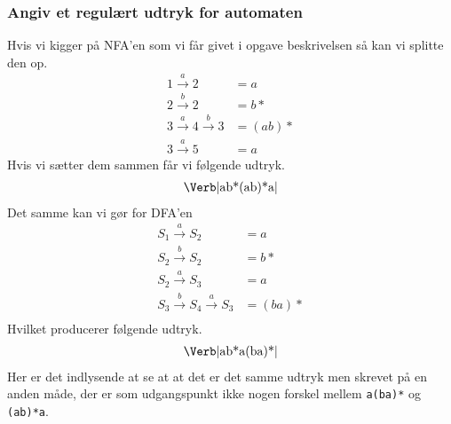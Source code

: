 \subsubsection{Angiv et regulært udtryk for automaten}
Hvis vi kigger på NFA'en som vi får givet i opgave beskrivelsen så kan vi splitte den op.
\begin{align*}
  1\xrightarrow{a}2 &= a\\
  2\xrightarrow{b}2 &= b*\\
  3\xrightarrow{a}4\xrightarrow{b}3 &= \left(ab\right)*\\
  3\xrightarrow{a}5 &= a
\end{align*}
Hvis vi sætter dem sammen får vi følgende udtryk.
\begin{align*}
  \text{\Verb|ab*(ab)*a|}
\end{align*}
Det samme kan vi gør for DFA'en
\begin{align*}
  S_1\xrightarrow{a}S_2 &= a\\
  S_2\xrightarrow{b}S_2 &= b*\\
  S_2\xrightarrow{a}S_3 &= a\\
  S_3\xrightarrow{b}S_4\xrightarrow{a}S_3 &= \left(ba\right)*\\
\end{align*}
Hvilket producerer følgende udtryk.
\begin{align*}
  \text{\Verb|ab*a(ba)*|}
\end{align*}
Her er det indlysende at se at at det er det samme udtryk men skrevet på en anden måde, der er som udgangspunkt ikke nogen forskel mellem \Verb|a(ba)*| og \Verb|(ab)*a|.
